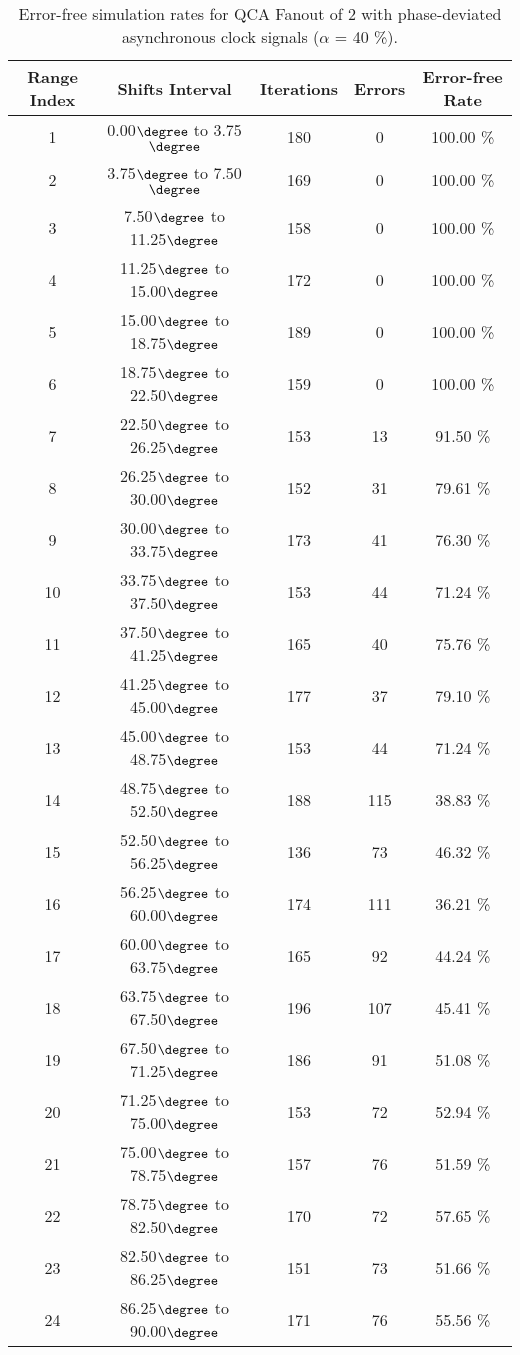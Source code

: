 \flushleft
\begin{table}[h]
\begin{center}
\caption{Error-free simulation rates for QCA Fanout of 2 with phase-deviated asynchronous clock signals ($\alpha$ = 40 \%).}
\begin{tabular}{|c|c|c|c|c|}
\hline
\textbf{Range Index} & \textbf{Shifts Interval} & \textbf{Iterations} & \textbf{Errors} & \textbf{Error-free Rate} \\
\hline
1  &  0.00$\degree$ to  3.75$\degree$ & 180 &  0 & 100.00 \% \\
\hline
2  &  3.75$\degree$ to  7.50$\degree$ & 169 &  0 & 100.00 \% \\
\hline
3  &  7.50$\degree$ to 11.25$\degree$ & 158 &  0 & 100.00 \% \\
\hline
4  & 11.25$\degree$ to 15.00$\degree$ & 172 &  0 & 100.00 \% \\
\hline
5  & 15.00$\degree$ to 18.75$\degree$ & 189 &  0 & 100.00 \% \\
\hline
6  & 18.75$\degree$ to 22.50$\degree$ & 159 &  0 & 100.00 \% \\
\hline
7  & 22.50$\degree$ to 26.25$\degree$ & 153 & 13 & 91.50 \% \\
\hline
8  & 26.25$\degree$ to 30.00$\degree$ & 152 & 31 & 79.61 \% \\
\hline
9  & 30.00$\degree$ to 33.75$\degree$ & 173 & 41 & 76.30 \% \\
\hline
10 & 33.75$\degree$ to 37.50$\degree$ & 153 & 44 & 71.24 \% \\
\hline
11 & 37.50$\degree$ to 41.25$\degree$ & 165 & 40 & 75.76 \% \\
\hline
12 & 41.25$\degree$ to 45.00$\degree$ & 177 & 37 & 79.10 \% \\
\hline
13 & 45.00$\degree$ to 48.75$\degree$ & 153 & 44 & 71.24 \% \\
\hline
14 & 48.75$\degree$ to 52.50$\degree$ & 188 & 115 & 38.83 \% \\
\hline
15 & 52.50$\degree$ to 56.25$\degree$ & 136 & 73 & 46.32 \% \\
\hline
16 & 56.25$\degree$ to 60.00$\degree$ & 174 & 111 & 36.21 \% \\
\hline
17 & 60.00$\degree$ to 63.75$\degree$ & 165 & 92 & 44.24 \% \\
\hline
18 & 63.75$\degree$ to 67.50$\degree$ & 196 & 107 & 45.41 \% \\
\hline
19 & 67.50$\degree$ to 71.25$\degree$ & 186 & 91 & 51.08 \% \\
\hline
20 & 71.25$\degree$ to 75.00$\degree$ & 153 & 72 & 52.94 \% \\
\hline
21 & 75.00$\degree$ to 78.75$\degree$ & 157 & 76 & 51.59 \% \\
\hline
22 & 78.75$\degree$ to 82.50$\degree$ & 170 & 72 & 57.65 \% \\
\hline
23 & 82.50$\degree$ to 86.25$\degree$ & 151 & 73 & 51.66 \% \\
\hline
24 & 86.25$\degree$ to 90.00$\degree$ & 171 & 76 & 55.56 \% \\
\hline


\end{tabular}
\end{center}
\end{table}
